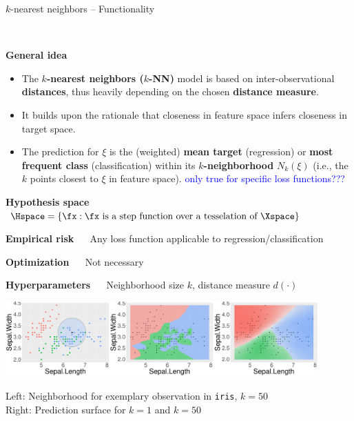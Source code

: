 \documentclass[11pt,compress,t,notes=noshow, xcolor=table]{beamer}
\newcommand{\maketag}[1]{\colorbox{highlightcol}{\textcolor{white}
{\MakeUppercase{#1}}}}
\newcommand{\highlight}[1]{\textcolor{highlightcol}{\textbf{#1}}}
\let\code=\texttt
\begin{document}
\begin{frame}{$k$-nearest neighbors -- Functionality}

\footnotesize

\maketag{Supervised}
\maketag{Non-parametric}
\maketag{White-box}

\medskip

\highlight{General idea}
\begin{itemize}
  \item The \textbf{$k$-nearest neighbors ($k$-NN)} model is based on 
  inter-observational \textbf{distances}, thus heavily depending on the chosen 
  \textbf{distance measure}.
  \item It builds upon the rationale that closeness in feature space infers
  closeness in target space.
  \item The prediction for $\xi$ is the (weighted) \textbf{mean target} 
  (regression) or \textbf{most frequent class} (classification) within 
  its \textbf{$k$-neighborhood} $N_k(\xi)$ (i.e., the $k$ points closest to $\xi$ in
  feature space). \textcolor{blue}{only true for specific loss
  functions???}
\end{itemize}

\medskip
 
\highlight{Hypothesis space} ~~ $\Hspace = \left\{ \fx: \fx \text{ is a step 
function over a tesselation of } \Xspace \right\}$

\medskip

\highlight{Empirical risk} ~~ Any loss function applicable to 
regression/classification

\highlight{Optimization} ~~ Not necessary

\highlight{Hyperparameters} ~~ Neighborhood size $k$, distance measure 
$d(\cdot)$

\medskip

\begin{minipage}{0.85\textwidth}
  \includegraphics[width=0.9\textwidth]{figure/knn-neighborhood.pdf}
\end{minipage}%
\begin{minipage}{0.15\textwidth}
  \tiny
  Left: Neighborhood for exemplary observation in \code{iris}, $k = 50$ \\
  Right: Prediction surface for $k = 1$ and $k = 50$
\end{minipage}
\end{frame}
\end{document}
